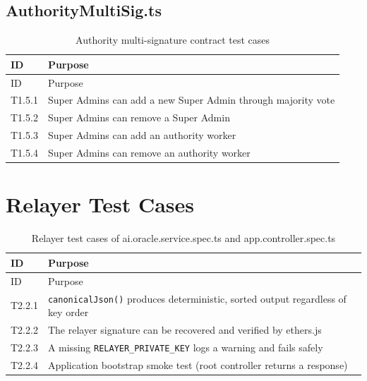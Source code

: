 \subsection{AuthorityMultiSig.ts}

\begin{longtable}{p{}|p{}}
\caption{Authority multi-signature contract test cases} \\

 {ID} &   {Purpose} \\
\hline
\endfirsthead
\hline
  {ID} &   {Purpose} \\
\hline
\endhead
T1.5.1 & Super Admins can add a new Super Admin through majority vote \\
\hline
T1.5.2 & Super Admins can remove a Super Admin \\
\hline
T1.5.3 & Super Admins can add an authority worker \\
\hline
T1.5.4 & Super Admins can remove an authority worker \\

\end{longtable}

\section{Relayer Test Cases}

\label{apndx:relayer-test-cases}



\begin{longtable}{p{}|p{}}
\caption{Relayer test cases of ai.oracle.service.spec.ts and app.controller.spec.ts} \\

 {ID} &   {Purpose} \\
\hline
\endfirsthead
\hline
  {ID} &   {Purpose} \\
\hline
\endhead
T2.2.1 & \texttt{canonicalJson()} produces deterministic, sorted output regardless of key order \\
\hline
T2.2.2 & The relayer signature can be recovered and verified by ethers.js \\
\hline
T2.2.3 & A missing \texttt{RELAYER\_PRIVATE\_KEY} logs a warning and fails safely \\
\hline
T2.2.4 & Application bootstrap smoke test (root controller returns a response) \\

\end{longtable}


